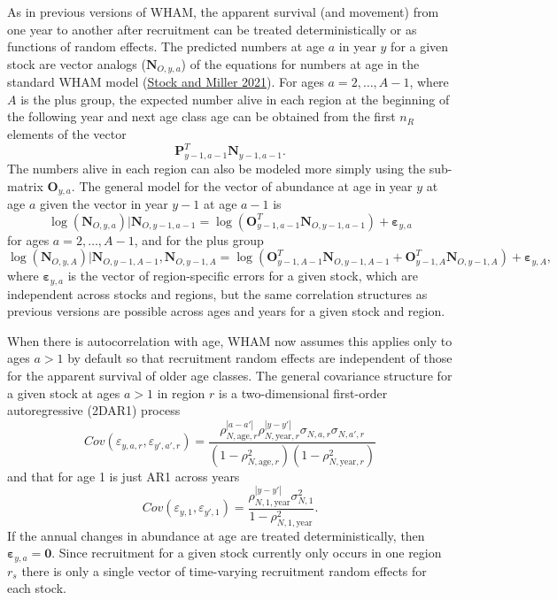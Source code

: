 \documentclass[
]{article}
\begin{document}
As in previous versions of WHAM, the apparent survival (and movement) from one year to another after recruitment can be treated deterministically or as functions of random effects. The predicted numbers at age \(a\) in year \(y\) for a given stock are vector analogs (\(\mathbf{N}_{O,y,a}\)) of the equations for numbers at age in the standard WHAM model (\protect\hyperlink{ref-stockmiller21}{Stock and Miller 2021}). For ages \(a = 2,\ldots, A-1\), where \(A\) is the plus group, the expected number alive in each region at the beginning of the following year and next age class age can be obtained from the first \(n_R\) elements of the vector
\[\mathbf{P}_{y-1,a-1}^T \mathbf{N}_{y-1,a-1}.\]
The numbers alive in each region can also be modeled more simply using the sub-matrix \(\mathbf{O}_{y,a}\). The general model for the vector of abundance at age in year \(y\) at age \(a\) given the vector in year \(y-1\) at age \(a-1\) is
\begin{equation*}
\log\left(\mathbf{N}_{O,y,a}\right)|\mathbf{N}_{O,y-1,a-1} =  \log\left(\mathbf{O}_{y-1,a-1}^T \mathbf{N}_{O,y-1,a-1}\right) + \boldsymbol{\varepsilon}_{y,a}
\end{equation*}
for ages \(a = 2,\ldots, A-1\), and for the plus group
\begin{equation*}
\log\left(\mathbf{N}_{O,y,A}\right)|\mathbf{N}_{O,y-1,A-1},\mathbf{N}_{O,y-1,A} = \log\left(\mathbf{O}_{y-1,A-1}^T \mathbf{N}_{O,y-1,A-1} + \mathbf{O}_{y-1,A}^T \mathbf{N}_{O,y-1,A}\right) + \boldsymbol{\varepsilon}_{y,A},
\end{equation*}
where \(\boldsymbol{\varepsilon}_{y,a}\) is the vector of region-specific errors for a given stock, which are independent across stocks and regions, but the same correlation structures as previous versions are possible across ages and years for a given stock and region.

When there is autocorrelation with age, WHAM now assumes this applies only to ages \(a>1\) by default so that recruitment random effects are independent of those for the apparent survival of older age classes. The general covariance structure for a given stock at ages \(a>1\) in region \(r\) is a two-dimensional first-order autoregressive (2DAR1) process
\begin{equation*}
  Cov\left(\varepsilon_{y,a,r},\varepsilon_{y',a',r}\right) =   \frac{\rho_{N,\text{age},r}^{|a-a'|}\rho_{N,\text{year},r}^{|y-y'|}\sigma_{N,a,r}\sigma_{N,a',r}}{\left(1 -  \rho_{N,\text{age},r}^2\right)\left(1 - \rho_{N,\text{year},r}^2\right)} 
\end{equation*}
and that for age 1 is just AR1 across years
\begin{equation*}
  Cov\left(\varepsilon_{y,1},\varepsilon_{y',1}\right) =   \frac{\rho_{N,1,\text{year}}^{|y-y'|}\sigma^2_{N,1}}{1 - \rho_{N,1,\text{year}}^2}.
\end{equation*}
If the annual changes in abundance at age are treated deterministically, then \(\boldsymbol{\varepsilon}_{y,a} = \mathbf{0}\). Since recruitment for a given stock currently only occurs in one region \(r_s\) there is only a single vector of time-varying recruitment random effects for each stock.
\end{document}
